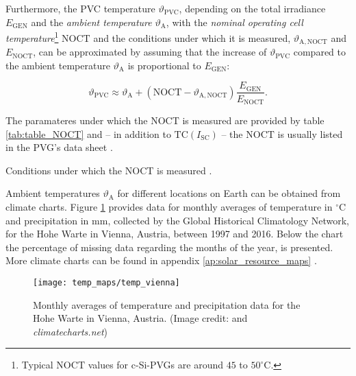 Furthermore, the PVC temperature $\vartheta_{\mathrm{PVC}}$, depending on the total irradiance $E_{\mathrm{GEN}}$ and the \emph{ambient temperature} $\vartheta_{\mathrm{A}}$, with the \emph{nominal operating cell temperature}\footnote{Typical $\mathrm{NOCT}$ values for c-Si-PVGs are around $45$ to $50^\circ \mathrm{C}$.} $\mathrm{NOCT}$ and the conditions under which it is measured, $\vartheta_{\mathrm{A,NOCT}}$ and $E_{\mathrm{NOCT}}$, can be approximated by assuming that the increase of $\vartheta_{\mathrm{PVC}}$ compared to the ambient temperature $\vartheta_{\mathrm{A}}$ is proportional to $E_{\mathrm{GEN}}$:
\begin{center}
	\begin{equation} \label{eq:cell_temp}
		\vartheta_{\mathrm{PVC}} \approx \vartheta_{\mathrm{A}} + \left(\mathrm{NOCT} - \vartheta_{\mathrm{A,NOCT}}\right) \frac{E_{\mathrm{GEN}}}{E_{\mathrm{NOCT}}} \text{.}
	\end{equation}
\end{center}
The paramateres under which the $\mathrm{NOCT}$ is measured are provided by table \ref{tab:table_NOCT} and -- in addition to $\mathrm{TC}\left(I_{\mathrm{SC}}\right)$ -- the $\mathrm{NOCT}$ is usually listed in the PVG's data sheet \cite{Mertens:2015}.

\begin{table}[h!]
	\centering
	
	\caption{Conditions under which the NOCT is measured \cite{Mertens:2015}.}
	\label{tab:table_NOCT}
\end{table}

Ambient temperatures $\vartheta_{\mathrm{A}}$ for different locations on Earth can be obtained from climate charts. Figure \ref{fig:temp_vienna} provides data for monthly averages of temperature in $^\circ \mathrm{C}$ and precipitation in $\mathrm{mm}$, collected by the Global Historical Climatology Network, for the Hohe Warte in Vienna, Austria, between 1997 and 2016. Below the chart the percentage of missing data regarding the months of the year, is presented. More climate charts can be found in appendix \ref{ap:solar_resource_maps} \cite{Zepner:2020}.

\begin{figure}[h!]
	\centering
  	\texttt{[image: temp\_maps/temp\_vienna]}
  	\caption{Monthly averages of temperature and precipitation data for the Hohe Warte in Vienna, Austria. (Image credit: \cite{Zepner:2020} and \emph{climatecharts.net})}
	\label{fig:temp_vienna}
\end{figure}

